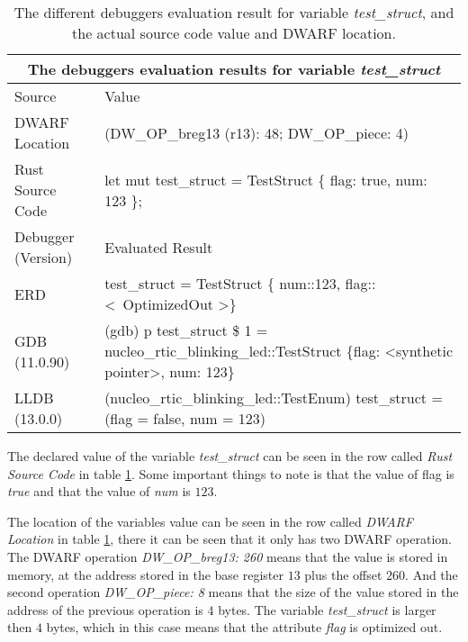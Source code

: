 \begin{table}[h]
	\centering
	\small
	\begin{tabular}{ |p{2cm}|p{8cm}|  }
		\hline
		\multicolumn{2}{|c|}{\textbf{The debuggers evaluation results for variable \emph{test\_struct}}} \\ 
		\hline
		\hline
		Source & Value \\
		\hline

		DWARF Location & (DW\_OP\_breg13 (r13): 48; DW\_OP\_piece: 4) \\

		Rust Source Code & let mut test\_struct = TestStruct \{ flag: true, num: 123 \}; \\
		\hline
		\hline
		Debugger (Version) & Evaluated Result \\
		\hline
		ERD & test\_struct = TestStruct \{ num::123, flag::\textless \ OptimizedOut \textgreater \} \\

		GDB (11.0.90)  & (gdb) p test\_struct\newline
		\$ 1 = nucleo\_rtic\_blinking\_led::TestStruct \{flag: \textless synthetic pointer\textgreater, num: 123\} \\

		LLDB (13.0.0) & (nucleo\_rtic\_blinking\_led::TestEnum) test\_struct = (flag = false, num = 123) \\
		\hline
	\end{tabular}
	\caption{The different debuggers evaluation result for variable \emph{test\_struct}, and the actual source code value and DWARF location.}
	\label{table:struct}
\end{table}


The declared value of the variable \emph{test\_struct} can be seen in the row called \emph{Rust Source Code} in table \ref{table:struct}.
Some important things to note is that the value of flag is \emph{true} and that the value of \emph{num} is $123$.


The location of the variables value can be seen in the row called \emph{DWARF Location} in table \ref{table:struct}, there it can be seen that it only has two \gls{DWARF} operation.
The \gls{DWARF} operation \emph{DW\_OP\_breg13: 260} means that the value is stored in memory, at the address stored in the base register $13$ plus the offset $260$. 
And the second operation \emph{DW\_OP\_piece: 8} means that the size of the value stored in the address of the previous operation is $4$ bytes.
The variable \emph{test\_struct} is larger then $4$ bytes, which in this case means that the attribute \emph{flag} is optimized out.


